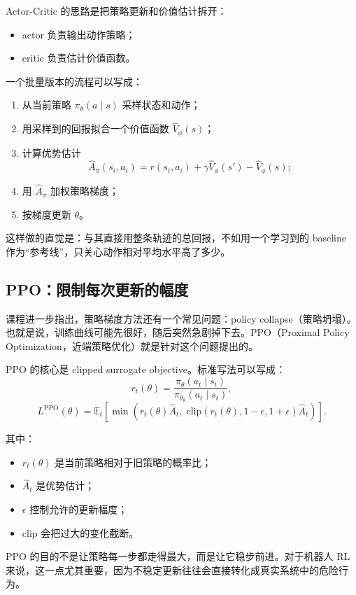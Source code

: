 \documentclass[a4paper]{article}
\begin{document}
Actor-Critic 的思路是把策略更新和价值估计拆开：
\begin{itemize}
  \item actor 负责输出动作策略；
  \item critic 负责估计价值函数。
\end{itemize}

一个批量版本的流程可以写成：
\begin{enumerate}
  \item 从当前策略 \(\pi_\theta(a\mid s)\) 采样状态和动作；
  \item 用采样到的回报拟合一个价值函数 \(\hat V_\phi(s)\)；
  \item 计算优势估计
  \[
  \hat A_\pi(s_i,a_i)=r(s_i,a_i)+\gamma\hat V_\phi(s')-\hat V_\phi(s);
  \]
  \item 用 \(\hat A_\pi\) 加权策略梯度；
  \item 按梯度更新 \(\theta\)。
\end{enumerate}

这样做的直觉是：与其直接用整条轨迹的总回报，不如用一个学习到的 baseline 作为“参考线”，只关心动作相对平均水平高了多少。

\subsection{PPO：限制每次更新的幅度}

课程进一步指出，策略梯度方法还有一个常见问题：policy collapse（策略坍塌）。也就是说，训练曲线可能先很好，随后突然急剧掉下去。PPO（Proximal Policy Optimization，近端策略优化）就是针对这个问题提出的。

PPO 的核心是 clipped surrogate objective。标准写法可以写成：
\[
r_t(\theta)=\frac{\pi_\theta(a_t\mid s_t)}{\pi_{\theta_k}(a_t\mid s_t)},
\]
\[
L^{\mathrm{PPO}}(\theta)=\mathbb{E}_t\left[\min\left(r_t(\theta)\hat A_t,\;\mathrm{clip}\!\left(r_t(\theta),1-\epsilon,1+\epsilon\right)\hat A_t\right)\right].
\]

其中：
\begin{itemize}
  \item \(r_t(\theta)\) 是当前策略相对于旧策略的概率比；
  \item \(\hat A_t\) 是优势估计；
  \item \(\epsilon\) 控制允许的更新幅度；
  \item \(\mathrm{clip}\) 会把过大的变化截断。
\end{itemize}

PPO 的目的不是让策略每一步都走得最大，而是让它稳步前进。对于机器人 RL 来说，这一点尤其重要，因为不稳定更新往往会直接转化成真实系统中的危险行为。
\end{document}
